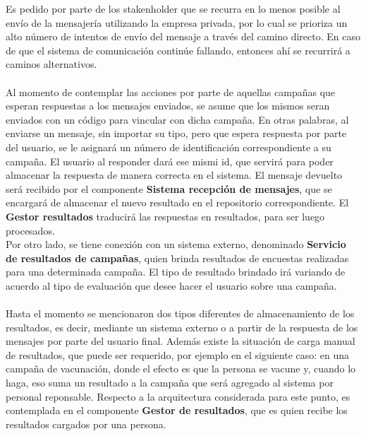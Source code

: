 \documentclass[a4paper, 11pt]{article}
\begin{document}
Es pedido por parte de los stakenholder que se recurra en lo menos posible al envío de la mensajería utilizando la empresa privada, por lo cual se prioriza un alto número de intentos de envío del mensaje a través del camino directo. En caso de que el sistema de comunicación continúe fallando, entonces ahí se recurrirá a caminos alternativos.
\\
\\
Al momento de contemplar las acciones por parte de aquellas campañas que esperan respuestas a los mensajes enviados, se asume que los mismos seran enviados con un código para vincular con dicha campaña. En otras palabras, al enviarse un mensaje, sin importar su tipo, pero que espera respuesta por parte del usuario, se le asignará un número de identificación correspondiente a su campaña. El usuario al responder dará ese mismi id, que servirá para poder almacenar la respuesta de manera correcta en el sistema. El mensaje devuelto será recibido por el componente \textbf{Sistema recepción de mensajes}, que se encargará de almacenar el nuevo resultado en el repositorio correspondiente. El \textbf{Gestor resultados} traducirá las respuestas en resultados, para ser luego procesados. \\

Por otro lado, se tiene conexión con un sistema externo, denominado \textbf{Servicio de resultados de campañas}, quien brinda resultados de encuestas realizadas para una determinada campaña. El tipo de resultado brindado irá variando de acuerdo al tipo de evaluación que desee hacer el usuario sobre una campaña. \\
\\
Hasta el momento se mencionaron dos tipos diferentes de almacenamiento de los resultados, es decir, mediante un sistema externo o a partir de la respuesta de los mensajes por parte del usuario final. 
Además existe la situación de carga manual de resultados, que puede ser requerido, por ejemplo en el siguiente caso: en una campaña de vacunación, donde el efecto es que la persona se vacune y, cuando lo haga, eso suma un resultado a la campaña que será agregado al sistema por personal reponsable. 
Respecto a la arquitectura considerada para este punto, es contemplada en el componente \textbf{Gestor de resultados}, que es quien recibe los resultados cargados por una persona.
\end{document}
